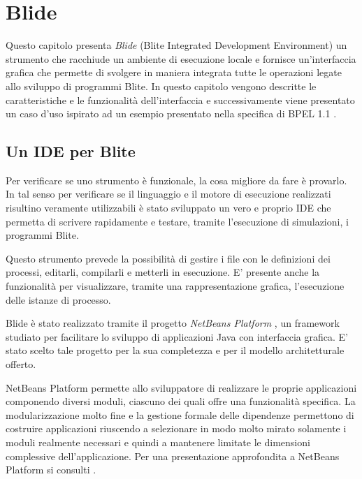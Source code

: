 \chapter{Blide}

Questo capitolo presenta \emph{Blide} (Blite Integrated Development
Environment) un strumento che racchiude un ambiente di esecuzione locale e
fornisce un'interfaccia grafica che permette di svolgere in maniera integrata
tutte le operazioni legate allo sviluppo di programmi Blite. 
In questo capitolo vengono descritte le caratteristiche e le funzionalità
dell'interfaccia e successivamente viene presentato un caso d'uso ispirato ad
un esempio presentato nella specifica di BPEL 1.1 \cite{BPEL10Spec}.

\section{Un IDE per Blite}

Per verificare se uno strumento è funzionale, la cosa migliore da fare
è provarlo. In tal senso per verificare se il linguaggio e il motore di
esecuzione realizzati risultino veramente utilizzabili è stato sviluppato un
vero e proprio IDE che permetta di scrivere rapidamente e testare, tramite
l'esecuzione di simulazioni, i programmi Blite.

Questo strumento prevede la possibilità di
gestire i file con le definizioni dei processi, editarli, compilarli e metterli
in esecuzione. E' presente anche la funzionalità per visualizzare, tramite una
rappresentazione grafica, l'esecuzione delle istanze di processo.

Blide è stato realizzato tramite il progetto \emph{NetBeans Platform}
\cite{NBPlatSite}, un framework studiato per facilitare lo sviluppo di
applicazioni Java con interfaccia grafica. E' stato scelto tale progetto per la sua
completezza e per il modello architetturale offerto. 

NetBeans Platform permette allo sviluppatore di realizzare le proprie
applicazioni componendo diversi moduli, ciascuno dei quali offre una
funzionalità specifica. La modularizzazione molto fine e la gestione
formale delle dipendenze permettono di costruire applicazioni riuscendo a
selezionare in modo molto mirato solamente i moduli realmente necessari e
quindi a mantenere limitate le dimensioni complessive dell'applicazione. 
Per una presentazione approfondita a NetBeans Platform si consulti
\cite{RichClientApp}.


